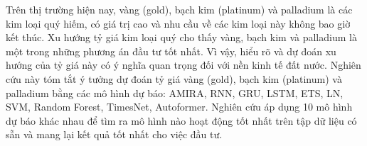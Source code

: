 Trên thị trường hiện nay, vàng (gold), bạch kim (platinum) và palladium là các kim loại quý hiếm, có giá trị cao và nhu cầu về các kim loại này không bao giờ kết thúc. Xu hướng tỷ giá kim loại quý cho thấy vàng, bạch kim và palladium là một trong những phương án đầu tư tốt nhất. Vì vậy, hiểu rõ và dự đoán xu hướng của tỷ giá này có ý nghĩa quan trọng đối với nền kinh tế đất nước. Nghiên cứu này tóm tắt ý tưởng dự đoán tỷ giá vàng (gold), bạch kim (platinum) và palladium bằng các mô hình dự báo: AMIRA, RNN, GRU, LSTM, ETS, LN, SVM, Random Forest, TimesNet, Autoformer. Nghiên cứu áp dụng 10 mô hình dự báo khác nhau để tìm ra mô hình nào hoạt động tốt nhất trên tập dữ liệu có sẵn và mang lại kết quả tốt nhất cho việc đầu tư.